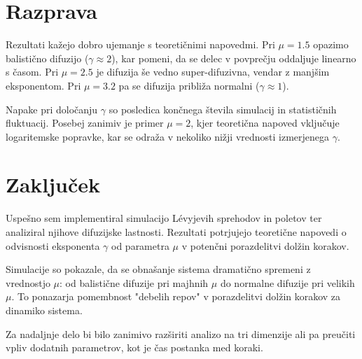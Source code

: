\documentclass{article}
\begin{document}
\section{Razprava}

Rezultati kažejo dobro ujemanje s teoretičnimi napovedmi. Pri $\mu=1.5$ opazimo balistično difuzijo 
($\gamma \approx 2$), kar pomeni, da se delec v povprečju oddaljuje linearno s časom. Pri $\mu=2.5$ 
je difuzija še vedno super-difuzivna, vendar z manjšim eksponentom. Pri $\mu=3.2$ pa se difuzija približa 
normalni ($\gamma \approx 1$).

Napake pri določanju $\gamma$ so posledica končnega števila simulacij in statističnih fluktuacij. Posebej 
zanimiv je primer $\mu=2$, kjer teoretična napoved vključuje logaritemske popravke, kar se odraža v nekoliko 
nižji vrednosti izmerjenega $\gamma$.

\newpage

\section{Zaključek}

Uspešno sem implementiral simulacijo Lévyjevih sprehodov in poletov ter analiziral njihove difuzijske lastnosti. 
Rezultati potrjujejo teoretične napovedi o odvisnosti eksponenta $\gamma$ od parametra $\mu$ v potenčni 
porazdelitvi dolžin korakov.

Simulacije so pokazale, da se obnašanje sistema dramatično spremeni z vrednostjo $\mu$: od balistične difuzije 
pri majhnih $\mu$ do normalne difuzije pri velikih $\mu$. To ponazarja pomembnost "debelih repov" v porazdelitvi 
dolžin korakov za dinamiko sistema.

Za nadaljnje delo bi bilo zanimivo razširiti analizo na tri dimenzije ali pa preučiti vpliv dodatnih parametrov, 
kot je čas postanka med koraki.
\end{document}
